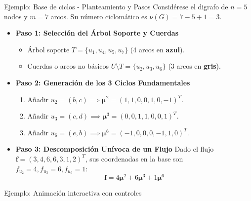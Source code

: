 \documentclass[
  ignorenonframetext,
]{beamer}
\providecommand{\tightlist}{%
  \setlength{\itemsep}{0pt}\setlength{\parskip}{0pt}}
\begin{document}
\begin{frame}{Ejemplo: Base de ciclos - Planteamiento y Pasos}
\label{ejemplo-base-de-ciclos---planteamiento-y-pasos}
Considérese el digrafo de \(n = 5\) nodos y \(m = 7\) arcos. Su número
ciclomático es \(\nu(G) = 7 - 5 + 1 = 3\).

\begin{itemize}
\tightlist
\item
  \textbf{Paso 1: Selección del Árbol Soporte y Cuerdas}

  \begin{itemize}
  \tightlist
  \item
    Árbol soporte \(T = \{u_1, u_4, u_5, u_7\}\) (4 arcos en
    \textbf{azul}).
  \item
    Cuerdas o arcos no básicos \(U \setminus T = \{u_2, u_3, u_6\}\) (3
    arcos en \textbf{gris}).
  \end{itemize}
\item
  \textbf{Paso 2: Generación de los 3 Ciclos Fundamentales}

  \begin{enumerate}
  \tightlist
  \item
    Añadir
    \(u_2 = (b, c) \implies \mathbf{\mu}^2 = (1, 1, 0, 0, 1, 0, -1)^T\).
  \item
    Añadir
    \(u_3 = (c, d) \implies \mathbf{\mu}^3 = (0, 0, 1, 1, 0, 0, 1)^T\).
  \item
    Añadir
    \(u_6 = (e, b) \implies \mathbf{\mu}^6 = (-1, 0, 0, 0, -1, 1, 0)^T\).
  \end{enumerate}
\item
  \textbf{Paso 3: Descomposición Unívoca de un Flujo} Dado el flujo
  \(\mathbf{f} = (3, 4, 6, 6, 3, 1, 2)^T\), sus coordenadas en la base
  son \(f_{u_2} = 4, f_{u_3} = 6, f_{u_6} = 1\):
  \[\mathbf{f} = 4 \mathbf{\mu}^2 + 6 \mathbf{\mu}^3 + 1 \mathbf{\mu}^6\]
\end{itemize}
\end{frame}

\begin{frame}{Ejemplo: Animación interactiva con controles}
\label{ejemplo-animaciuxf3n-interactiva-con-controles}
\end{frame}
\end{document}
